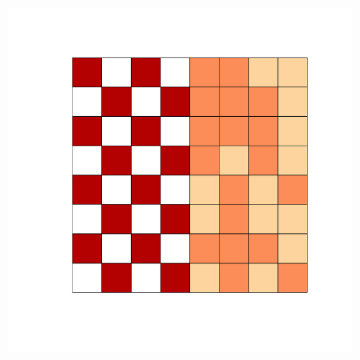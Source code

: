 \documentclass[
  shownotes,
  xcolor={svgnames},
  hyperref={colorlinks,citecolor=DarkBlue,linkcolor=DarkRed,urlcolor=DarkBlue}
  ]{beamer}
\begin{document}
\begin{frame}[fragile]
\begin{minipage}[t]{0.43\linewidth}
\begin{figure}[H]
          \begin{subfigure}{0.45\linewidth}
          \includegraphics[scale=.21]{figures/spatial_heterogeneity.pdf}
          \end{subfigure}

  \end{figure}
    \end{minipage}

\end{frame}
\end{document}

